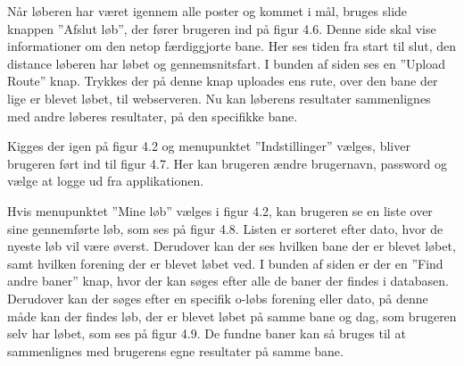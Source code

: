 Når løberen har været igennem alle poster og kommet i mål, bruges slide knappen ”Afslut løb”, der fører brugeren ind på figur 4.6. Denne side skal vise informationer om den netop færdiggjorte bane. Her ses tiden fra start til slut, den distance løberen har løbet og gennemsnitsfart. I bunden af siden ses en ”Upload Route” knap. Trykkes der på denne knap uploades ens rute, over den bane der lige er blevet løbet, til webserveren. Nu kan løberens resultater sammenlignes med andre løberes resultater, på den specifikke bane.

Kigges der igen på figur 4.2 og menupunktet ”Indstillinger” vælges, bliver brugeren ført ind til figur 4.7. Her kan brugeren ændre brugernavn, password og vælge at logge ud fra applikationen.

Hvis menupunktet ”Mine løb” vælges i figur 4.2, kan brugeren se en liste over sine gennemførte løb, som ses på figur 4.8. Listen er sorteret efter dato, hvor de nyeste løb vil være øverst. Derudover kan der ses hvilken bane der er blevet løbet, samt hvilken forening der er blevet løbet ved. I bunden af siden er der en ”Find andre baner” knap, hvor der kan søges efter alle de baner der findes i databasen. Derudover kan der søges efter en specifik o-løbs forening eller dato, på denne måde kan der findes løb, der er blevet løbet på samme bane og dag, som brugeren selv har løbet, som ses på figur 4.9. De fundne baner kan så bruges til at sammenlignes med brugerens egne resultater på samme bane.

